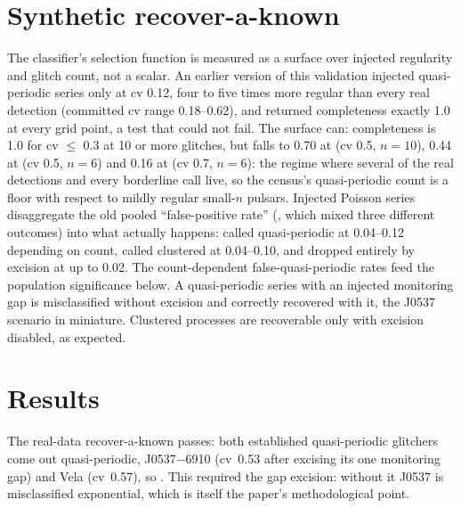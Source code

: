 \documentclass[twocolumn]{aastex631}
\begin{document}
\section{Synthetic recover-a-known}
The classifier's selection function is measured as a surface over injected regularity and glitch
count, not a scalar. An earlier version of this validation injected quasi-periodic series only
at cv 0.12, four to five times more regular than every real detection (committed cv range
0.18--0.62), and returned completeness exactly 1.0 at every grid point, a test that could not
fail. The surface can: completeness is 1.0 for cv $\le$ 0.3 at 10 or more glitches, but falls
to 0.70 at (cv 0.5, $n=10$), 0.44 at (cv 0.5, $n=6$) and 0.16 at (cv 0.7, $n=6$): the regime
where several of the real detections and every borderline call live, so the census's
quasi-periodic count is a floor with respect to mildly regular small-$n$ pulsars. Injected
Poisson series disaggregate the old pooled ``false-positive rate'' (\gpSynFP, which mixed three
different outcomes) into what actually happens: called quasi-periodic at 0.04--0.12 depending on
count, called clustered at 0.04--0.10, and dropped entirely by excision at up to 0.02. The
count-dependent false-quasi-periodic rates feed the population significance below. A
quasi-periodic series with an injected monitoring gap is misclassified without excision and
correctly recovered with it, the J0537 scenario in miniature. Clustered processes are
recoverable only with excision disabled, as expected.

\section{Results}
\label{sec:results}
The real-data recover-a-known passes: both established quasi-periodic glitchers come out
quasi-periodic, J0537$-$6910 (cv~0.53 after excising its one monitoring gap) and Vela
(cv~0.57), so \gpRealKnownQpOK. This required the gap excision: without it J0537 is misclassified
exponential, which is itself the paper's methodological point.
\end{document}
